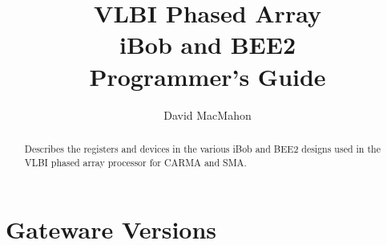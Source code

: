 \documentclass[12pt]{article}
\author{David MacMahon}
\title{VLBI Phased Array \\ iBob and BEE2 \\ Programmer's Guide}
\begin{document}
\maketitle
\setlength{\parindent}{0pt}
\setlength{\parskip}{1ex plus 0.5ex minus 0.2ex}
\setlength{\itemseporig}{\itemsep}

\newcommand{\tighten}{
  \setlength{\itemsep}{-\parskip}
}
\newcommand{\loosen}{
  \setlength{\itemsep}{\itemseporig}
}
\newcommand{\LSB}{least significant byte }
\newcommand{\LSn}{least significant nybble }
\newcommand{\LSb}{least significant bit }
\newcommand{\LSns}{least significant nybbles }
\newcommand{\LSbs}{least significant bits }
\newcommand{\MSb}{most significant bit }
\newcommand{\MSbs}{most significant bits }
\newcommand{\MSB}{most significant byte }
\newcommand{\devitem}[2]{\item[#1] [#2] \\ }
\newcommand{\rwreg}[1]{\devitem{#1}{R/W register}}
\newcommand{\rwregn}[1]{\item[#1] {} \tighten} %
\newcommand{\rwregs}[1]{\devitem{#1}{R/W registers} \loosen} %
\newcommand{\roreg}[1]{\devitem{#1}{R register}}
\newcommand{\roregn}[1]{\item[#1] {} \tighten} %
\newcommand{\roregs}[1]{\devitem{#1}{R registers} \loosen} %
\newcommand{\bram}[1]{\devitem{#1}{Block RAM}}
\newcommand{\bramn}[1]{\item[#1] {} \tighten} %
\newcommand{\brams}[1]{\devitem{#1}{Block RAM} \loosen} %
\newcommand{\tinysh}[1]{\devitem{#1}{TinySh Command}}
\newcommand{\degree}[1]{$#1^{\circ}$}
\newcommand{\e}[1]{\ensuremath{\times 10^{#1}}}

\newcommand{\ipaver}{\_2012\_Feb\_23\_0953}
\newcommand{\dbever}{\_2012\_Feb\_09\_2131}
\newcommand{\bccver}{\_2011\_Feb\_17\_2045}

\begin{abstract}
Describes the registers and devices in the various iBob and BEE2 designs used
in the VLBI phased array processor for CARMA and SMA.
\end{abstract}


\section{Gateware Versions}
\end{document}
